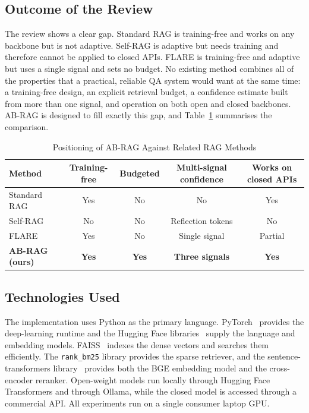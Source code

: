 \documentclass[conference,a4paper,10pt]{IEEEtran}
\begin{document}
\subsection{Outcome of the Review}
The review shows a clear gap. Standard RAG is training-free and works on any backbone but
is not adaptive. Self-RAG is adaptive but needs training and therefore cannot be applied
to closed APIs. FLARE is training-free and adaptive but uses a single signal and sets no
budget. No existing method combines all of the properties that a practical, reliable QA
system would want at the same time: a training-free design, an explicit retrieval budget,
a confidence estimate built from more than one signal, and operation on both open and
closed backbones. AB-RAG is designed to fill exactly this gap, and Table~\ref{tab:pos}
summarises the comparison.

\begin{table}[t]
\centering
\caption{Positioning of AB-RAG Against Related RAG Methods}
\label{tab:pos}
\renewcommand{\arraystretch}{1.2}
\begin{tabular}{lcccc}
\toprule
\textbf{Method} & \textbf{Training-free} & \textbf{Budgeted} & \textbf{Multi-signal confidence} & \textbf{Works on closed APIs} \\
\midrule
Standard RAG~\cite{lewis2020rag} & Yes & No & No & Yes \\
Self-RAG~\cite{asai2024selfrag} & No & No & Reflection tokens & No \\
FLARE~\cite{jiang2023flare} & Yes & No & Single signal & Partial \\
\textbf{AB-RAG (ours)} & \textbf{Yes} & \textbf{Yes} & \textbf{Three signals} & \textbf{Yes} \\
\bottomrule
\end{tabular}
\end{table}

\subsection{Technologies Used}
The implementation uses Python as the primary language. PyTorch~\cite{paszke2019pytorch}
provides the deep-learning runtime and the Hugging Face
libraries~\cite{wolf2020transformers} supply the language and embedding models.
FAISS~\cite{johnson2021faiss} indexes the dense vectors and searches them efficiently.
The \texttt{rank\_bm25} library provides the sparse retriever, and the
sentence-transformers library~\cite{reimers2019sbert} provides both the BGE embedding
model and the cross-encoder reranker. Open-weight models run locally through Hugging Face
Transformers and through Ollama, while the closed model is accessed through a commercial
API. All experiments run on a single consumer laptop GPU.
\end{document}
